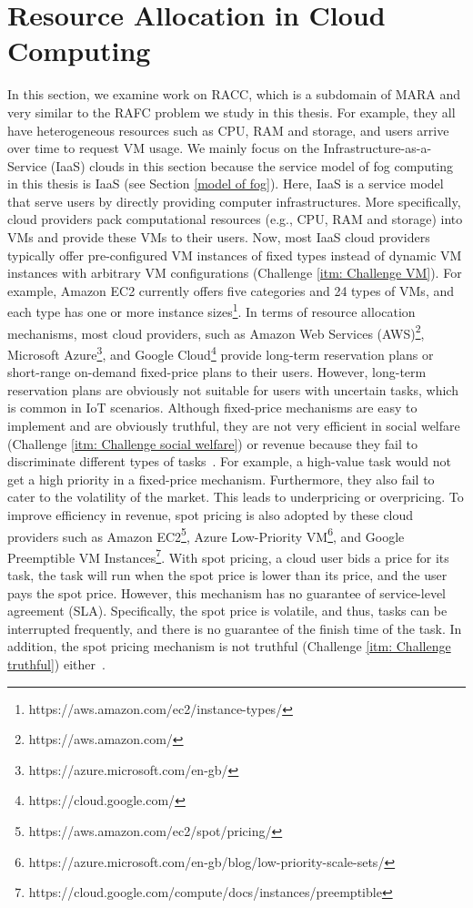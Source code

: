 \documentclass[11pt]{phdthesis}
\begin{document}
\section{Resource Allocation in Cloud Computing} \label{resource-allocation-in-cloud-computing}

In this section, we examine work on RACC, which is a subdomain of MARA and very similar to the RAFC problem we study in this thesis. For example, they all have heterogeneous resources such as CPU, RAM and storage, and users arrive over time to request VM usage.
We mainly focus on the Infrastructure-as-a-Service (IaaS) clouds in this section because the service model of fog computing in this thesis is IaaS (see Section \ref{model of fog}). Here, IaaS is a service model that serve users by directly providing computer infrastructures. More specifically, cloud providers pack computational resources (e.g., CPU, RAM and storage) into VMs and provide these VMs to their users. Now, most IaaS cloud providers typically offer pre-configured VM instances of fixed types instead of dynamic VM instances with arbitrary VM configurations (Challenge \ref{itm: Challenge VM}). For example, Amazon EC2 currently offers five categories and 24 types of VMs, and each type has one or more instance sizes\footnote{https://aws.amazon.com/ec2/instance-types/}. In terms of resource allocation mechanisms, most cloud providers, such as Amazon Web Services (AWS)\footnote{https://aws.amazon.com/}, Microsoft Azure\footnote{https://azure.microsoft.com/en-gb/}, and Google Cloud\footnote{https://cloud.google.com/} provide long-term reservation plans or short-range on-demand fixed-price plans to their users. However, long-term reservation plans are obviously not suitable for users with uncertain tasks, which is common in IoT scenarios.  Although fixed-price mechanisms are easy to implement and are obviously truthful, they are not very efficient in social welfare (Challenge \ref{itm: Challenge social welfare}) or revenue because they fail to discriminate different types of tasks~\citep{al2013cloud}. For example, a high-value task would not get a high priority in a fixed-price mechanism. Furthermore, they also fail to cater to the volatility of the market. This leads to underpricing or overpricing. To improve efficiency in revenue, spot pricing is also adopted by these cloud providers such as
Amazon EC2\footnote{https://aws.amazon.com/ec2/spot/pricing/}, Azure Low-Priority VM\footnote{https://azure.microsoft.com/en-gb/blog/low-priority-scale-sets/}, and Google Preemptible VM Instances\footnote{https://cloud.google.com/compute/docs/instances/preemptible}. With spot pricing, a cloud user bids a price for its task, the task will run when the spot price is lower than its price, and the user pays the spot price. However, this mechanism has no guarantee of service-level agreement (SLA). Specifically, the spot price is volatile, and thus, tasks can be interrupted frequently, and there is no guarantee of the finish time of the task. In addition, the spot pricing mechanism is not truthful (Challenge \ref{itm: Challenge truthful}) either~\citep{wang2012cloud}.
\end{document}
